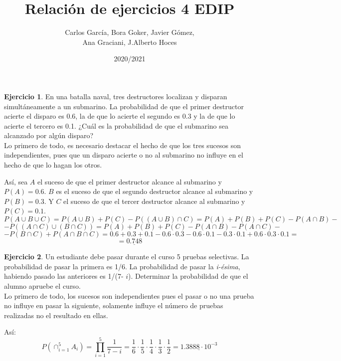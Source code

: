 \documentclass[a4paper, 12pt]{article}
\title{\textbf{Relación de ejercicios 4 EDIP}}
\author{Carlos García, Bora Goker, Javier Gómez,  \\ Ana Graciani, J.Alberto Hoces}
\date{2020/2021}
\theoremstyle{definition}
\newtheorem{ej}{Ejercicio}
\begin{document}
\maketitle

\begin{ej}
En una batalla naval, tres destructores localizan y disparan simultáneamente a un submarino. La probabilidad de que el primer destructor acierte el disparo es 0.6, la de que lo acierte el segundo es 0.3 y la de que lo acierte el tercero es 0.1. ¿Cuál es la probabilidad de que el submarino sea alcanzado por algún disparo? \\

Lo primero de todo, es necesario destacar el hecho de que los tres sucesos son independientes, pues que un disparo acierte o no al submarino no influye en el hecho de que lo hagan los otros. 

Así, sea \(A\) el suceso de que el primer destructor alcance al submarino y \(P(A) = 0.6\). \(B\) es el suceso de que el segundo destructor alcance al submarino y \(P(B) = 0.3\). Y \(C\) el suceso de que el tercer destructor alcance al submarino y \(P(C) = 0.1\).
\[
	P(A \cup B \cup C) = P(A \cup B) + P(C) - P((A \cup B) \cap C) = P(A) + P(B) + P(C) - P(A \cap B) -
\]
\[
	- P((A\cap C) \cup (B \cap C)) = P(A) + P(B) + P(C) - P(A \cap B) - P(A \cap C) - 
\]
\[
	- P(B \cap C) + P(A \cap B \cap C) = 0.6 + 0.3 + 0.1 - 0.6 \cdot 0.3 - 0.6 \cdot 0.1 - 0.3 \cdot 0.1 + 0.6 \cdot 0.3 \cdot 0.1 =
\]
\[
	= \underline{0.748}
\]

\end{ej}

\bigskip

\begin{ej}
Un estudiante debe pasar durante el curso 5 pruebas selectivas. La probabilidad de pasar la primera es 1/6. La probabilidad de pasar la \textit{i-ésima}, habiendo pasado las anteriores es 1/(7- \(i\)). Determinar la probabilidad de que el alumno apruebe el curso. \\

Lo primero de todo, los sucesos son independientes pues el pasar o no una prueba no influye en pasar la siguiente, solamente influye el número de pruebas realizadas no el resultado en ellas.

Así:
\[
	P \left( \cap_{i=1}^{5} A_i \right) = \prod_{i=1}^{5} \frac{1}{7-i} = \frac{1}{6} \cdot \frac{1}{5} \cdot \frac{1}{4} \cdot \frac{1}{3} \cdot \frac{1}{2} = \underline{1.3888 \cdot 10^{-3}}
\]
\end{ej}
\end{document}
